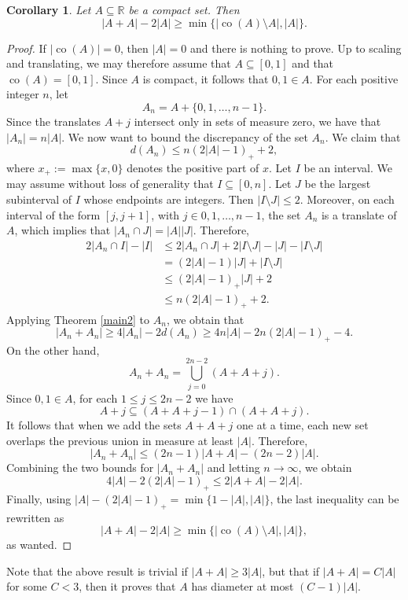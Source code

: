 \documentclass[11pt,reqno]{amsart}
\newtheorem{corollary}[theorem]{Corollary}
\theoremstyle{definition}
\def\R{\mathbb{R}}
\def\subset{\subseteq}
\begin{document}
\begin{corollary}
Let $A\subset\R$ be a compact set. Then
$$
    |A+A|-2|A|
    \geq
    \min\bigl\{
        |\operatorname{co}(A)\setminus A|,
        |A|
    \bigr\}.
$$
\end{corollary}
\begin{proof}
    If $|\operatorname{co}(A)|=0$, then $|A|=0$ and there is nothing to prove.
Up to scaling and translating, we may therefore assume that $A\subset[0,1]$
and that $\operatorname{co}(A)=[0,1]$. Since $A$ is compact, it follows that
$0,1\in A$.
For each positive integer $n$, let
$$
    A_n=A+\{0,1,\dots,n-1\}.
$$
Since the translates $A+j$ intersect only in sets of measure zero, we have that $|A_n|=n|A|$. We now want to bound the discrepancy of the set $A_n$.
We claim that
$$
    d(A_n)\leq n(2|A|-1)_+ +2,
$$
where $x_+ := \max\{x,0\}$ denotes the positive part of $x$.
Let $I$ be an interval. We may assume without loss of generality that $I\subseteq [0,n]$. Let $J$ be the largest subinterval of $I$ whose endpoints are integers. Then $|I\setminus J|\leq 2$. Moreover, on each interval of the form $[j,j+1]$, with $j\in{0,1,\dots,n-1}$, the set $A_n$ is a translate of $A$, which implies that $|A_n\cap J|=|A||J|$.
Therefore, 
$$
\begin{aligned}
2|A_n\cap I|-|I|
&\leq 2|A_n\cap J|+2|I\setminus J|-|J|-|I\setminus J|\\
&=(2|A|-1)|J|+|I\setminus J|\\
&\leq (2|A|-1)_+|J|+2\\
&\leq n(2|A|-1)_+ +2.
\end{aligned}
$$
Applying Theorem \ref{main2} to $A_n$, we obtain that
$$
    |A_n+A_n|
    \geq
    4|A_n|-2d(A_n)
    \geq
    4n|A|-2n(2|A|-1)_+-4.
$$
On the other hand,
$$
    A_n+A_n=\bigcup_{j=0}^{2n-2}(A+A+j).
$$
Since $0,1\in A$, for each $1\leq j\leq 2n-2$ we have
$$
    A+j\subset (A+A+j-1)\cap(A+A+j).
$$
It follows that when we add the sets
$A+A+j$ one at a time, each new set overlaps the previous union in measure at
least $|A|$. Therefore,
$$
    |A_n+A_n|
    \leq
    (2n-1)|A+A|-(2n-2)|A|.
$$
Combining the two bounds for $|A_n+A_n|$ and letting $n\to\infty$, we obtain
$$
4|A|-2(2|A|-1)_+
\leq
2|A+A|-2|A|.
$$
Finally, using $|A|-(2|A|-1)_+=\min\{1-|A|,|A|\}$, the last inequality can be rewritten as
$$
    |A+A|-2|A|
    \geq
    \min\bigl\{
        |\operatorname{co}(A)\setminus A|,
        |A|
    \bigr\},
$$
as wanted.
\end{proof}

Note that the above result is trivial if $|A+A|\geq 3|A|$, but that if $|A+A|=C|A|$ for some $C<3$, then it proves that $A$ has diameter at most $(C-1)|A|$.
\end{document}
